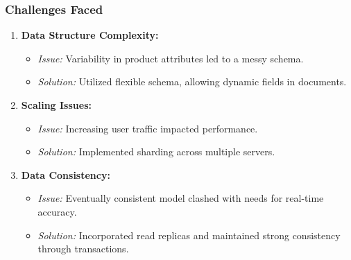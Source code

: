 \documentclass[aspectratio=169]{beamer}
\begin{document}
\begin{frame}[fragile]
    \frametitle{Challenges Faced}
    \begin{enumerate}
        \item \textbf{Data Structure Complexity:}
        \begin{itemize}
            \item \textit{Issue:} Variability in product attributes led to a messy schema.
            \item \textit{Solution:} Utilized flexible schema, allowing dynamic fields in documents.
        \end{itemize}
        
        \item \textbf{Scaling Issues:}
        \begin{itemize}
            \item \textit{Issue:} Increasing user traffic impacted performance.
            \item \textit{Solution:} Implemented sharding across multiple servers.
        \end{itemize}
        
        \item \textbf{Data Consistency:}
        \begin{itemize}
            \item \textit{Issue:} Eventually consistent model clashed with needs for real-time accuracy.
            \item \textit{Solution:} Incorporated read replicas and maintained strong consistency through transactions.
        \end{itemize}
    \end{enumerate}
\end{frame}
\end{document}
